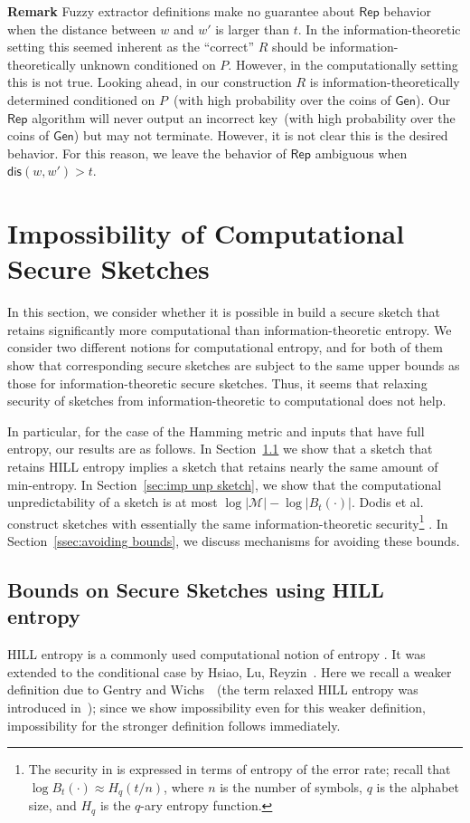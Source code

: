 \documentclass{llncs}
\newcommand{\secref}[1]{\mbox{Section~\ref{#1}}}
\newcommand{\class}[1]{{\ensuremath{\mathsf{#1}}}}
\newcommand{\gen}{\ensuremath{\class{Gen}}\xspace}
\newcommand{\rep}{\ensuremath{\class{Rep}}\xspace}
\newcommand{\dis}{\ensuremath{\mathsf{dis}}}
\begin{document}
\textbf{Remark}  Fuzzy extractor definitions make no guarantee about \rep behavior when the distance between $w$ and $w'$ is larger than $t$.  In the information-theoretic setting this seemed inherent as the ``correct'' $R$ should be information-theoretically unknown conditioned on $P$.  However, in the computationally setting this is not true.  Looking ahead, in our construction $R$ is information-theoretically determined conditioned on $P$~(with high probability over the coins of \gen).  Our $\rep$ algorithm will never output an incorrect key~(with high probability over the coins of \gen) but may not terminate.  However, it is not clear this is the desired behavior.  For this reason, we leave the behavior of \rep ambiguous when $\dis(w, w')>t$.

\section{Impossibility of Computational Secure Sketches}
\label{sec:impossCompSecSketch}
In this section, we consider whether it is possible in build a secure sketch that retains significantly more computational than information-theoretic entropy.  We consider two different notions for computational entropy, and for both of them show that corresponding secure sketches are subject to the same upper bounds as those for information-theoretic secure sketches. Thus, it seems that relaxing security of sketches from information-theoretic to computational does not help.

In particular, for the case of the Hamming metric and inputs that have full entropy, our results are as follows.  In  \secref{sec:imp HILL sketch} we show that a sketch that retains HILL entropy implies a sketch that retains nearly the same amount of min-entropy.  In \secref{sec:imp unp sketch}, we show that the computational unpredictability of a sketch is at most $\log |\mathcal{M}| - \log |B_t(\cdot)|$. Dodis et al. \cite[Section 8.2]{DBLP:journals/siamcomp/DodisORS08}  construct sketches with essentially the same information-theoretic security\footnote{The security in  \cite[Section 8.2]{DBLP:journals/siamcomp/DodisORS08}  is expressed in terms of entropy of the error rate; recall that $\log B_t(\cdot)\approx H_q(t/n)$, where $n$ is the number of symbols, $q$ is the alphabet size, and $H_q$ is the $q$-ary entropy function.} . 
In \secref{ssec:avoiding bounds}, we discuss mechanisms for avoiding these bounds.

\subsection{Bounds on Secure Sketches using HILL entropy}
\label{sec:imp HILL sketch}
HILL entropy is a commonly used computational notion of entropy \cite{DBLP:journals/siamcomp/HastadILL99}.  It was extended to the conditional case by Hsiao, Lu, Reyzin~\cite{DBLP:conf/eurocrypt/HsiaoLR07}. Here we recall a weaker definition due to Gentry and Wichs~\cite{gentry2011separating}~(the term relaxed HILL entropy was introduced in~\cite{reyzin2011some}); since we show impossibility even for this weaker definition, impossibility for the stronger definition follows immediately.
\end{document}
